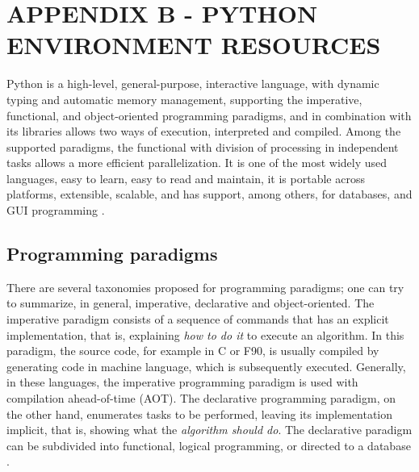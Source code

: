 \renewcommand{\thechapter}{B}
\chapter{APPENDIX B - PYTHON ENVIRONMENT RESOURCES}
\label{appendixB}

Python is a high-level, general-purpose, interactive language, with dynamic typing and automatic memory management, supporting the imperative, functional, and object-oriented programming paradigms, and in combination with its libraries allows two ways of execution, interpreted and compiled. Among the supported paradigms, the functional with division of processing in independent tasks allows a more efficient parallelization. It is one of the most widely used languages, easy to learn, easy to read and maintain, it is portable across platforms, extensible, scalable, and has support, among others, for databases, and GUI programming \cite {Sanner1999}.

%
%
%
\section{Programming paradigms}

There are several taxonomies proposed for programming paradigms; one can try to summarize, in general, imperative, declarative and object-oriented. The imperative paradigm consists of a sequence of commands that has an explicit implementation, that is, explaining \textit {how to do it} to execute an algorithm. In this paradigm, the source code, for example in C or F90, is usually compiled by generating code in machine language, which is subsequently executed. Generally, in these languages, the imperative programming paradigm is used with compilation ahead-of-time (AOT). The declarative programming paradigm, on the other hand, enumerates tasks to be performed, leaving its implementation implicit, that is, showing what the \textit {algorithm should do}. The declarative paradigm can be subdivided into functional, logical programming, or directed to a database \cite {Sebesta2016}.

